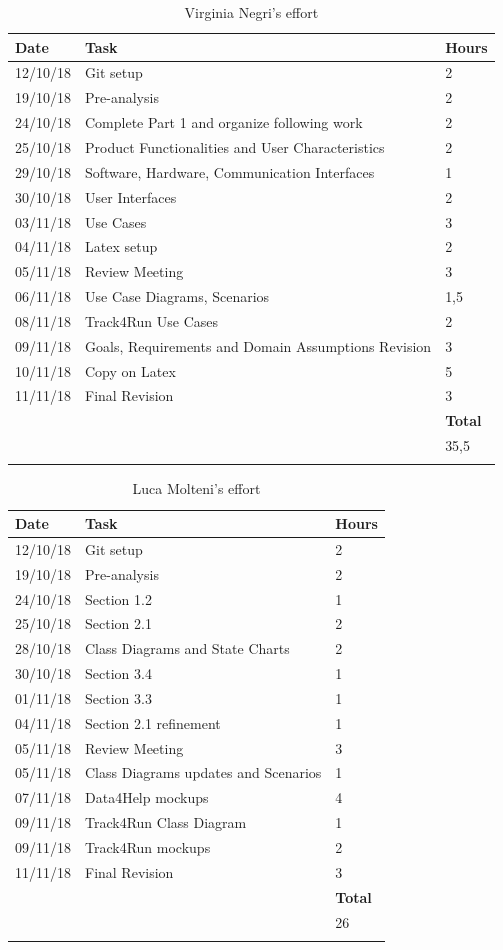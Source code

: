 \documentclass[titlepage]{article}
\begin{document}
		
	\begin{longtable}{| p{2 cm} | p{5 cm} | p{2 cm} |} 
			\hline
			{\bf Date} & {\bf Task} & {\bf Hours}\\
			\hline
			12/10/18 & Git setup & 2 \\
			19/10/18 & Pre-analysis & 2 \\
			24/10/18 & Complete Part 1 and organize following work & 2 \\
			25/10/18 & Product Functionalities and User Characteristics& 2 \\
			29/10/18 & Software, Hardware, Communication Interfaces & 1 \\
			30/10/18 & User Interfaces & 2 \\
			03/11/18 & Use Cases & 3 \\
			04/11/18 & Latex setup & 2 \\
			05/11/18 & Review Meeting & 3 \\
			06/11/18 & Use Case Diagrams, Scenarios & 1,5\\
			08/11/18 & Track4Run Use Cases & 2 \\
			09/11/18 & Goals, Requirements and Domain Assumptions Revision & 3 \\
			10/11/18 & Copy on Latex & 5 \\
			11/11/18 & Final Revision & 3 \\
			\hline
			& & {\bf Total} \\
			\hline
			& & 35,5 \\
			\hline
			\caption{Virginia Negri's effort}
		\end{longtable}
	
		\begin{longtable}{| p{2 cm} | p{5 cm} | p{2 cm} |} 
		\hline
		{\bf Date} & {\bf Task} & {\bf Hours}\\
		\hline
		12/10/18 & Git setup & 2 \\
		19/10/18 & Pre-analysis & 2 \\
		24/10/18 & Section 1.2 & 1 \\
		25/10/18 & Section 2.1 & 2 \\
		28/10/18 & Class Diagrams and State Charts & 2 \\
		30/10/18 & Section 3.4 & 1 \\
		01/11/18 & Section 3.3 & 1 \\
		04/11/18 & Section 2.1 refinement & 1 \\
		05/11/18 & Review Meeting & 3 \\
		05/11/18 & Class Diagrams updates and Scenarios & 1\\
		07/11/18 & Data4Help mockups & 4 \\
		09/11/18 & Track4Run Class Diagram & 1 \\
		09/11/18 & Track4Run mockups & 2 \\
		11/11/18 & Final Revision & 3 \\
		\hline
		& & {\bf Total} \\
		\hline
		& & 26 \\
		\hline
		\caption{Luca Molteni's effort}
	\end{longtable}
	
\end{document}
